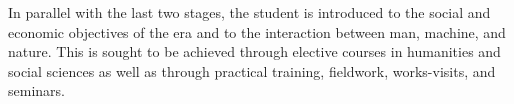 In parallel with the last two stages, the student is introduced to the social and economic objectives of the era and to the interaction between man, machine, and nature. This is sought to be achieved through elective courses in humanities and social sciences as well as through practical training, fieldwork, works-visits, and seminars. 